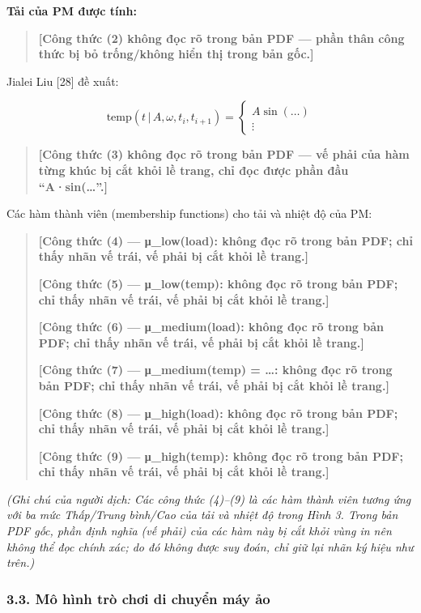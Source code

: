 \documentclass[
  vietnamese,
]{article}
\begin{document}
\textbf{Tải của PM được tính:}

\begin{quote}
\textbf{{[}Công thức (2) không đọc rõ trong bản PDF --- phần thân công
thức bị bỏ trống/không hiển thị trong bản gốc.{]}}
\end{quote}

Jialei Liu {[}28{]} đề xuất:

\[\text{temp}(t\,|\,A, \omega, t_i, t_{i+1}) = \begin{cases} A\sin(\dots) \\ \vdots \end{cases} \tag{3}\]

\begin{quote}
\textbf{{[}Công thức (3) không đọc rõ trong bản PDF --- vế phải của hàm
từng khúc bị cắt khỏi lề trang, chỉ đọc được phần đầu
``A·sin(\ldots{}''.{]}}
\end{quote}

Các hàm thành viên (membership functions) cho tải và nhiệt độ của PM:

\begin{quote}
\textbf{{[}Công thức (4) --- μ\_low(load): không đọc rõ trong bản PDF;
chỉ thấy nhãn vế trái, vế phải bị cắt khỏi lề trang.{]}}

\textbf{{[}Công thức (5) --- μ\_low(temp): không đọc rõ trong bản PDF;
chỉ thấy nhãn vế trái, vế phải bị cắt khỏi lề trang.{]}}

\textbf{{[}Công thức (6) --- μ\_medium(load): không đọc rõ trong bản
PDF; chỉ thấy nhãn vế trái, vế phải bị cắt khỏi lề trang.{]}}

\textbf{{[}Công thức (7) --- μ\_medium(temp) = \ldots: không đọc rõ
trong bản PDF; chỉ thấy nhãn vế trái, vế phải bị cắt khỏi lề trang.{]}}

\textbf{{[}Công thức (8) --- μ\_high(load): không đọc rõ trong bản PDF;
chỉ thấy nhãn vế trái, vế phải bị cắt khỏi lề trang.{]}}

\textbf{{[}Công thức (9) --- μ\_high(temp): không đọc rõ trong bản PDF;
chỉ thấy nhãn vế trái, vế phải bị cắt khỏi lề trang.{]}}
\end{quote}

\emph{(Ghi chú của người dịch: Các công thức (4)--(9) là các hàm thành
viên tương ứng với ba mức Thấp/Trung bình/Cao của tải và nhiệt độ trong
Hình 3. Trong bản PDF gốc, phần định nghĩa (vế phải) của các hàm này bị
cắt khỏi vùng in nên không thể đọc chính xác; do đó không được suy đoán,
chỉ giữ lại nhãn ký hiệu như trên.)}

\subsubsection{3.3. Mô hình trò chơi di chuyển máy
ảo}\label{muxf4-huxecnh-truxf2-chux1a1i-di-chuyux1ec3n-muxe1y-ux1ea3o}
\end{document}

